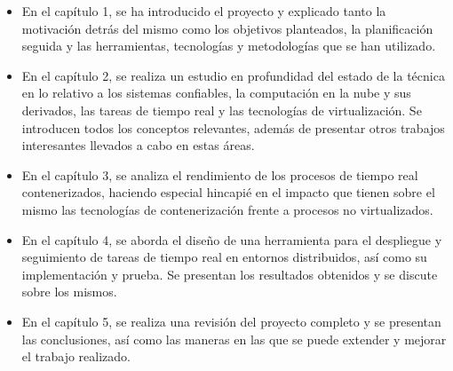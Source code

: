 \begin{itemize}
      \item En el capítulo 1, se ha introducido el proyecto y explicado tanto la motivación
            detrás del mismo como los objetivos planteados, la planificación seguida y las
            herramientas, tecnologías y metodologías que se han utilizado.

      \item En el capítulo 2, se realiza un estudio en profundidad del estado de la técnica
            en lo relativo a los sistemas confiables, la computación en la nube y sus
            derivados, las tareas de tiempo real y las tecnologías de virtualización. Se
            introducen todos los conceptos relevantes, además de presentar otros trabajos
            interesantes llevados a cabo en estas áreas.

      \item En el capítulo 3, se analiza el rendimiento de los procesos de tiempo real
            contenerizados, haciendo especial hincapié en el impacto que tienen sobre el
            mismo las tecnologías de contenerización frente a procesos no virtualizados.

      \item En el capítulo 4, se aborda el diseño de una herramienta para el despliegue y
            seguimiento de tareas de tiempo real en entornos distribuidos, así como su
            implementación y prueba. Se presentan los resultados obtenidos y se discute
            sobre los mismos.

      \item En el capítulo 5, se realiza una revisión del proyecto completo y se presentan
            las conclusiones, así como las maneras en las que se puede extender y mejorar el
            trabajo realizado.
\end{itemize}